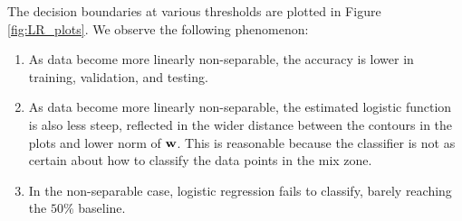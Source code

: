 The decision boundaries at various thresholds are plotted in Figure \ref{fig:LR_plots}. We observe the following phenomenon:
\begin{enumerate}
\item As data become more linearly non-separable, the accuracy is lower in training, validation, and testing.
\item As data become more linearly non-separable, the estimated logistic function is also less steep, reflected in the wider distance between the contours in the plots and lower norm of $\boldsymbol{\mathbf{w}}$. This is reasonable because the classifier is not as certain about how to classify the data points in the mix zone.
\item In the non-separable case, logistic regression fails to classify, barely reaching the $50\%$ baseline.
\end{enumerate}



